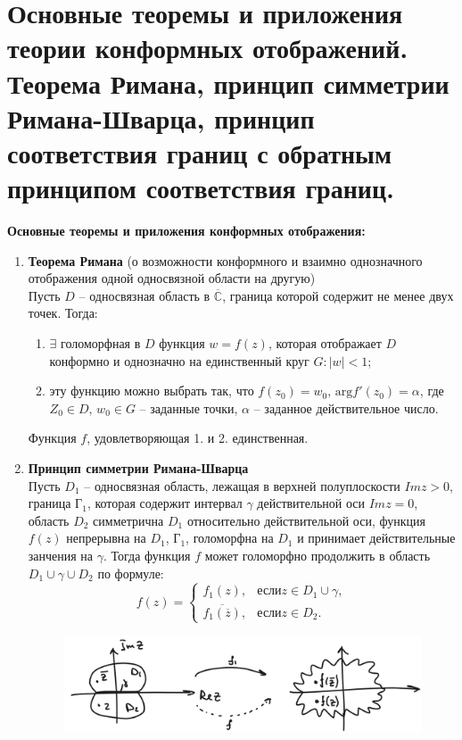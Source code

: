 \newpage
\section{Основные теоремы и приложения теории конформных отображений. Теорема Римана, принцип симметрии Римана-Шварца, принцип соответствия границ с обратным принципом соответствия границ.}

\textbf{Основные теоремы и приложения конформных отображения:}\\
\begin{enumerate}
\item \textbf{Теорема Римана} (о возможности конформного и взаимно однозначного отображения одной односвязной области на другую)\\
Пусть $D$ -- односвязная область в $\overline{\mathbb{C}}$, граница которой содержит не менее двух точек. Тогда: 
\begin{enumerate}
    \item $\exists$ голоморфная в $D$ функция $w=f(z)$, которая отображает $D$ конформно и однозначно на единственный круг $G: |w|<1$;
    \item эту функцию можно выбрать так, что $f(z_0)=w_0, \, \textrm{arg} f'(z_0)=\alpha$, где $Z_0 \in D, \, w_0 \in G$ -- заданные точки, $\alpha$ -- заданное действительное число.
\end{enumerate}
Функция $f$, удовлетворяющая 1. и 2. единственная.\\[2mm]

\item \textbf{Принцип симметрии Римана-Шварца}\\
Пусть $D_1$ -- односвязная область, лежащая в верхней полуплоскости $Im z>0$, граница Г$_1$, которая содержит интервал $\gamma$ действительной оси $Im z =0$, область $D_2$ симметрична $D_1$ относительно действительной оси, функция $f(z)$ непрерывна на $D_1$, Г$_1$, голоморфна на $D_1$ и принимает действительные занчения на $\gamma$. Тогда функция $f$ может голоморфно продолжить в область $D_1 \cup \gamma \cup D_2$ по формуле:
\begin{equation}
    f(z) = \begin{cases}
        f_1(z), & \textrm{если} z \in D_1 \cup \gamma, \\
        \overline{f_1(\overline{z})}, & \textrm{если} z \in D_2.
    \end{cases}
\end{equation}

\begin{figure}[h]
    \centering
    \includegraphics[width=1\linewidth]{answers/img/14_2.png}
\end{figure}


\end{enumerate}

